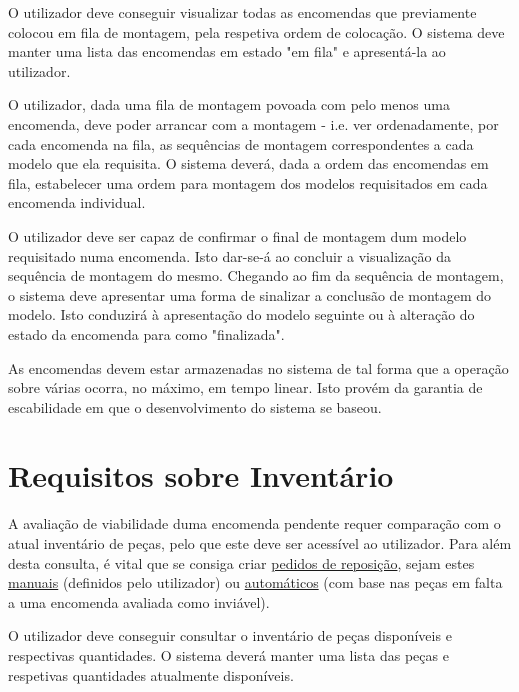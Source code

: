             {O utilizador deve conseguir visualizar todas as encomendas que previamente colocou em fila de montagem, pela respetiva ordem de colocação.}
            {O sistema deve manter uma lista das encomendas em estado "em fila" e apresentá-la ao utilizador.}

            {O utilizador, dada uma fila de montagem povoada com pelo menos uma encomenda, deve poder arrancar com a montagem - i.e. ver ordenadamente, por cada encomenda na fila, as sequências de montagem correspondentes a cada modelo que ela requisita.}
            {O sistema deverá, dada a ordem das encomendas em fila, estabelecer uma ordem para montagem dos modelos requisitados em cada encomenda individual.}

            {O utilizador deve ser capaz de confirmar o final de montagem dum modelo requisitado numa encomenda. Isto dar-se-á ao concluir a visualização da sequência de montagem do mesmo.}
            {Chegando ao fim da sequência de montagem, o sistema deve apresentar uma forma de sinalizar a conclusão de montagem do modelo. Isto conduzirá à apresentação do modelo seguinte ou à alteração do estado da encomenda para como "finalizada".}    

            {As encomendas devem estar armazenadas no sistema de tal forma que a operação sobre várias ocorra, no máximo, em tempo linear. Isto provém da garantia de escabilidade em que o desenvolvimento do sistema se baseou.}

    \newpage        
    \section{Requisitos sobre Inventário}

        A avaliação de viabilidade duma encomenda pendente requer comparação com o atual inventário de peças, pelo que este deve ser acessível ao utilizador. Para além desta consulta, é vital que se consiga criar \underline{pedidos de reposição}, sejam estes \underline{manuais} (definidos pelo utilizador) ou \underline{automáticos} (com base nas peças em falta a uma encomenda avaliada como inviável).

            {O utilizador deve conseguir consultar o inventário de peças disponíveis e respectivas quantidades.}
            {O sistema deverá manter uma lista das peças e respetivas quantidades atualmente disponíveis.}

